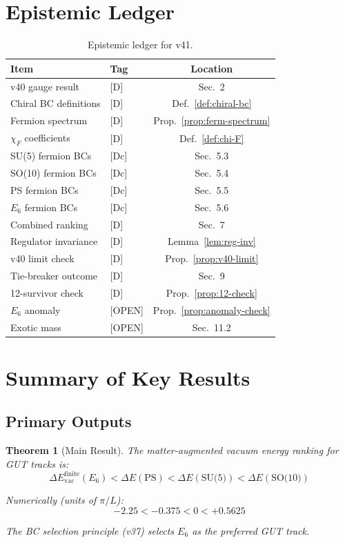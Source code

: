 \documentclass[11pt,a4paper]{article}
\newtheorem{theorem}{Theorem}[section]
\newcommand{\tagD}{\textcolor{blue!70!black}{[D]}}
\newcommand{\tagDc}{\textcolor{blue!50!black}{[Dc]}}
\newcommand{\tagOPEN}{\textcolor{red!70!black}{[OPEN]}}
\begin{document}
\section{Epistemic Ledger}
\label{app:ledger}

\begin{table}[h]
\centering
\begin{tabular}{llc}
\toprule
Item & Tag & Location \\
\midrule
v40 gauge result & \tagD & Sec.~2 \\
Chiral BC definitions & \tagD & Def.~\ref{def:chiral-bc} \\
Fermion spectrum & \tagD & Prop.~\ref{prop:ferm-spectrum} \\
$\chi_F$ coefficients & \tagD & Def.~\ref{def:chi-F} \\
SU(5) fermion BCs & \tagDc & Sec.~5.3 \\
SO(10) fermion BCs & \tagDc & Sec.~5.4 \\
PS fermion BCs & \tagDc & Sec.~5.5 \\
$E_6$ fermion BCs & \tagDc & Sec.~5.6 \\
Combined ranking & \tagD & Sec.~7 \\
Regulator invariance & \tagD & Lemma~\ref{lem:reg-inv} \\
v40 limit check & \tagD & Prop.~\ref{prop:v40-limit} \\
Tie-breaker outcome & \tagD & Sec.~9 \\
12-survivor check & \tagD & Prop.~\ref{prop:12-check} \\
$E_6$ anomaly & \tagOPEN & Prop.~\ref{prop:anomaly-check} \\
Exotic mass & \tagOPEN & Sec.~11.2 \\
\bottomrule
\end{tabular}
\caption{Epistemic ledger for v41.}
\label{tab:ledger}
\end{table}

\section{Summary of Key Results}
\label{app:summary}

\subsection{Primary Outputs}

\begin{theorem}[Main Result]
\label{thm:main}
The matter-augmented vacuum energy ranking for GUT tracks is:
\begin{equation}
\label{eq:main-result}
\boxed{\Delta E_{\text{vac}}^{\text{finite}}(E_6) < \Delta E(\text{PS}) < \Delta E(\text{SU(5)}) < \Delta E(\text{SO(10)})}
\end{equation}

Numerically (units of $\pi/L$):
\begin{equation}
\label{eq:main-numerical}
-2.25 < -0.375 < 0 < +0.5625
\end{equation}

The BC selection principle (v37) selects $E_6$ as the preferred GUT track.
\end{theorem}
\end{document}

